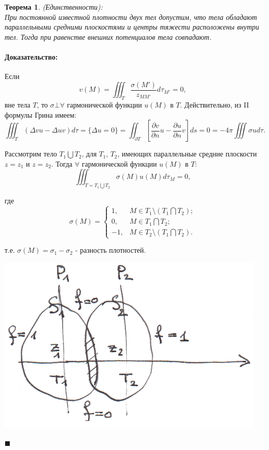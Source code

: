 \documentclass{article}
\newtheorem{theorem}{Теорема}
\newenvironment{proof}{\paragraph{Доказательство:}}{\hfill$\blacksquare$}
\begin{document}
\begin{theorem}
(Единственности): \\
При постоянной известной плотности двух тел допустим, что тела обладают параллельными средними плоскостями и центры тяжести расположены внутри тел. Тогда при равенстве внешних потенциалов тела совпадают.
\end{theorem}
\begin{proof}

Если
\begin{equation*}
	v(M) = \iiint_T \dfrac{\sigma(M')}{z_{MM'}} d \tau_{M'} = 0,
\end{equation*}
вне тела $T$, то $\sigma \bot \forall$ гармонической функции $u(M)$ в $T$. Действительно, из II формулы Грина имеем:
\begin{equation*}
	\iiint_T (\Delta v u - \Delta u v) d \tau = \{\Delta u = 0\} 
	= \iint_{\partial T} [\dfrac{\partial v}{\partial n} u - \dfrac{\partial u}{\partial n} v] ds 
	= 0 = - 4 \pi \iiint \sigma u d\tau.
\end{equation*}

Рассмотрим тело $T_1 \bigcup T_2$, для $T_1$, $T_2$, имеющих параллельные средние плоскости $z = z_1$ и $z = z_2$.
Тогда $\forall$ гармонической функции $u(M)$ в $T$:
\begin{equation*}
	\iiint_{T = T_1 \bigcup T_2} \sigma (M) u(M) d\tau_M = 0,
\end{equation*}

где
\begin{equation*}
	\sigma(M) = 
	\begin{cases}
		1, & M \in T_1 \setminus (T_1 \bigcap T_2);\\
		0, & M \in T_1 \bigcap T_2;\\
		-1, &M \in T_2 \setminus (T_1 \bigcap T_2).
	\end{cases}
\end{equation*}

т.е. $\sigma (M) = \sigma_1 - \sigma_2$ - разность плотностей.

\vspace{0.5cm}
\includegraphics[scale=0.85]{pic3_1.png}


\end{proof}
\end{document}
